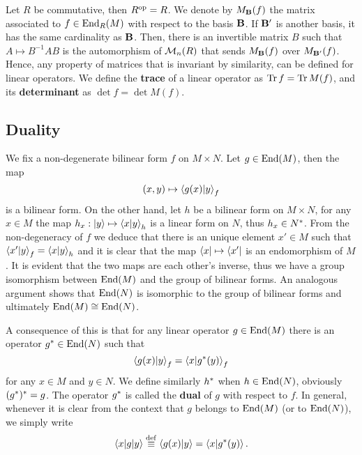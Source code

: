 Let $R$ be commutative, then $R^{\mathrm{op}} = R$. We denote by
$M_{\mathbf{B}}(f)$ the matrix associated to $f\in\operatorname{End}_R(M)$ with
respect to the basis $\mathbf{B}$.  If $\mathbf{B'}$ is another basis,
it has the same cardinality as $\mathbf{B}$. Then, there is an
invertible matrix $B$ such that $A\mapsto B^{-1}AB$ is the
automorphism of $\operatorname{\mathcal{M}}_n(R)$ that sends $M_{\mathbf{B}}(f)$ over
$M_{\mathbf{B'}}(f)$. Hence, any property of matrices that is invariant
by similarity, can be defined for linear operators. We define the
 \textbf{trace} of a linear
operator as $\operatorname{Tr} f = \operatorname{Tr} M(f)$, and its
\textbf{determinant} as $\det f = \det
M(f)$.


\subsection{Duality}
\label{sec:linear-algebra:duality}
We fix a non-degenerate bilinear form $f$ on $M\times N$. Let
$g\in\operatorname{End}(M)$, then the map
\[(x,y) \mapsto \left\langle g(x) \middle| y \right\rangle_f\] is a bilinear form. On the other
hand, let $h$ be a bilinear form on $M\times N$, for any $x\in M$ the
map $h_x : \left\lvert y \right\rangle \mapsto \left\langle x \middle| y \right\rangle_h$ is a linear form on $N$,
thus $h_x\in N^\ast$. From the non-degeneracy of $f$ we deduce that
there is an unique element $x'\in M$ such that
$\left\langle x' \middle| y \right\rangle_f=\left\langle x \middle| y \right\rangle_h$ and it is clear that the map
$\left\langle x \right\rvert\mapsto \left\langle x' \right\rvert$ is an endomorphism of $M$. It is evident
that the two maps are each other's inverse, thus we have a group
isomorphism between $\operatorname{End}(M)$ and the group of bilinear forms. An
analogous argument shows that $\operatorname{End}(N)$ is isomorphic to the group of
bilinear forms and ultimately $\operatorname{End}(M)\cong\operatorname{End}(N)$.

A consequence of this is that for any linear operator $g\in\operatorname{End}(M)$
there is an operator $g^\ast\in\operatorname{End}(N)$ such that
\[\left\langle g(x) \middle| y \right\rangle_f = \left\langle x \middle| g^\ast(y) \right\rangle_f\]
for any $x\in M$ and $y\in N$. We define similarly $h^\ast$ when
$h\in\operatorname{End}(N)$, obviously $(g^\ast)^\ast = g$. The operator
$g^\ast$ is called the
\textbf{dual} of $g$ with
respect to $f$. In general, whenever it is clear from the context that
$g$ belongs to $\operatorname{End}(M)$ (or to $\operatorname{End}(N)$), we simply
write
\[\left\langle x \middle| g \middle| y \right\rangle \overset{\mathrm{def}}{\equiv} \left\langle g(x) \middle| y \right\rangle = \left\langle x \middle| g^\ast(y) \right\rangle\text{.}\]

